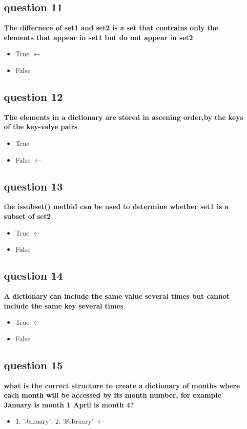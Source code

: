 \documentclass[10pt]{article}
\begin{document}
\subsection*{question 11 }
\textbf{The differnece of set1 and set2 is a set that contrains only the elements that appear in set1 but do not appear in set2}
\begin{itemize}
\item True $\leftarrow$
\item False
\end{itemize}
\subsection*{question 12}
\textbf{The elements in a dictionary are stored in ascening order,by the keys of the key-valye pairs}
\begin{itemize}
\item True
\item False $\leftarrow$
\end{itemize}
\subsection*{question 13}
\textbf{the issubset() methid can be used to determine whether set1 is a subset of set2}
\begin{itemize}
\item True $\leftarrow$
\item False
\end{itemize}
\subsection*{question 14}
\textbf{A dictionary can include the same value several times but cannot include the same key several times}
\begin{itemize}
\item True $\leftarrow$
\item False
\end{itemize}
\subsection*{question 15}
\textbf{what is the correct structure to create a dictionary of months where each month will be accessed by its month number, for example January is month 1 April is month 4?}
\begin{itemize}
\item 1: 'January'; 2: 'February' $\leftarrow$
\end{itemize}
\end{document}
